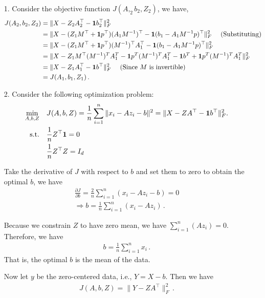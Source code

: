 \documentclass[a4paper]{article}
\newcommand*{\one}{{\bf 1}}
\theoremstyle{definition}
\newenvironment{soln}{
  \leavevmode\color{blue}\ignorespaces
}{}
\begin{document}
\begin{soln}
  \begin{itemize}
    \item [1.]
        Consider the objective function $J(A,_2 b_2, Z_2)$, we have,
        \begin{align*}
          J(A_2, b_2, Z_2) &= \| X - Z_2 A_2^\top - \one b_2^\top\|_F^2 \\
          &= \| X - (Z_1 M^\top + \one p^\top) (A_1 M^{-1})^\top - \one (b_1 - A_1 M^{-1} p)^\top\|_F^2 \quad \text{ (Substituting)}\\
          &= \| X - (Z_1 M^\top + \one p^\top) (M^{-1})^\top A_1^\top - \one (b_1 - A_1 M^{-1} p)^\top\|_F^2 \\
          &= \| X - Z_1M^\top (M^{-1})^TA_1^T  - \one p^T(M^{-1})^TA_1^T - \one b^T + \one p^T(M^{-1})^TA_1^T\|_F^2 \\
          &= \| X - Z_1 A_1^\top - \one b^\top\|_F^2 \quad \text{ (Since $M$ is invertible)} \\
          &= J(A_1, b_1, Z_1)\,.
        \end{align*}
    \item [2.]
    Consider the following optimization problem:
    \begin{align*}
      \min_{A, b, Z} \quad & J(A,b,Z) = \frac{1}{n} \sum_{i=1}^n \|x_i - Az_i - b\|^2 = \| X - ZA^\top - \one b^\top\|_F^2. \\
      \text{s.t.} \quad & \frac{1}{n} Z^\top \one = 0 \\
      & \frac{1}{n} Z^\top Z = I_d
    \end{align*}

    Take the derivative of $J$ with respect to $b$ and set them to zero to obtain the optimal $b$, we have
    \begin{align*}
      \frac{\partial J}{\partial b} = \frac{2}{n} \sum_{i=1}^n (x_i - Az_i - b) = 0 \\
      \Rightarrow b = \frac{1}{n} \sum_{i=1}^n (x_i - Az_i)\,.
    \end{align*}

    Because we constrain $Z$ to have zero mean, we have $\sum_{i=1}^n (Az_i) = 0$.
    Therefore, we have
    \begin{align*}
      b = \frac{1}{n} \sum_{i=1}^n x_i\,.
    \end{align*}
    That is, the optimal $b$ is the mean of the data.

    Now let $y$ be the zero-centered data, i.e., $Y = X - b$. Then we have
    \begin{align*}
      J(A, b, Z) = \| Y - ZA^\top \|_F^2\,.
    \end{align*}


\end{itemize}
\end{soln}
\end{document}
